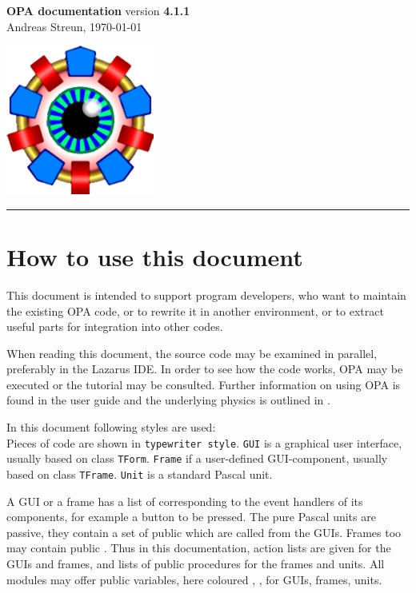 \documentclass[12pt]{article}
\newcommand\code[1]{{\tt #1}}
\newcommand\guico[1]{{\color{blue}\code{#1}}}
\newcommand\guifco[1]{{\color{violet}\code{#1}}}
\newcommand{\unico}[1]{{\color{burntorange}\code{#1}}}
\newcommand{\opagui}[1]{\colorbox{blue!20}{\code{#1}}}
\newcommand{\opaguif}[1]{\colorbox{violet!30}{\code{#1}}}
\newcommand{\opauni}[1]{\colorbox{orange!30}{\code{#1}}}
\begin{document}
\noindent
{}

\parbox[t]{0.7\hsize}{
  {\Huge\bf OPA documentation} version {\bf 4.1.1}\\
  Andreas Streun, \today
} \hfill  \includegraphics{opalogo_small.jpg}
\rule{\hsize}{1pt}

\section{How to use this document}
This document is intended to support program developers, who want to maintain the existing OPA code, or to rewrite it in another environment, or to extract useful parts for integration into other codes.

When reading this document, the source code may be examined in parallel, preferably in the Lazarus IDE. In order to see how the code works, OPA may be executed or the tutorial \cite{tutorial} may be consulted. Further information on using OPA is found in the user guide \cite{userguide} and the underlying physics is outlined in \cite{inside}.

In this document following styles are used:\\
Pieces of code are shown in \code{typewriter style}.
\opagui{GUI} is a graphical user interface, usually based on class \code{TForm}. \opaguif{Frame} if a user-defined GUI-component, usually based on class \code{TFrame}.  \opauni{Unit} is a standard Pascal unit. 

A GUI or a frame has a list of \guico{actions} corresponding to the event handlers of its components, for example a button to be pressed. The pure Pascal units are passive, they contain a set of public \unico{procedures} which are called from the GUIs. Frames too may contain public \guifco{procedures}. Thus in this documentation, action lists are given for the GUIs and frames, and lists of public procedures for the frames and units. All modules may offer public variables, here coloured \guico{x}, \guifco{y}, \unico{z} for GUIs, frames, units.
\end{document}
